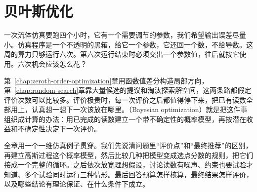 \chapter{贝叶斯优化}
\label{chap:bayesian-optimization}

一次流体仿真要跑四个小时，它有一个需要调节的参数，我们希望输出误差尽量小。仿真程序是一个不透明的黑箱，给它一个参数，它还回一个数，不给导数。这周的算力只够运行六次。第六次运行结束时必须交出一个参数值，往后就按它使用。六次机会应该怎么花？

第~\ref{chap:zeroth-order-optimization}章用函数值差分构造局部方向，第~\ref{chap:random-search}章靠大量候选的提议和淘汰探索解空间，这两条路都假定评价次数可以比较多。评价极贵时，每一次评价之后都值得停下来，把已有读数全部用上，认真想一想下一次该放在哪里。（Bayesian optimization）就是把这件事组织成计算的办法：用已完成的读数建立一个带不确定性的概率模型，再按潜在收益和不确定性决定下一次评价。

全章用一个一维仿真例子贯穿。我们先说清问题里“评价点”和“最终推荐”的区别，再建立高斯过程这个概率模型，然后比较几种把模型变成选点分数的规则，把它们接成一个完整的循环。之后依次放宽理想假设，讨论读数有噪声、约束也要试验才知道、多个试验同时运行三种情形。最后回答预算怎样核算，最终结果怎样评价，以及哪些结论有理论保证、在什么条件下成立。










